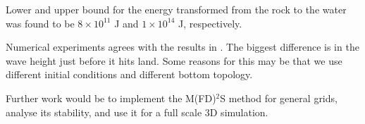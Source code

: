\documentclass[11pt]{article}
\begin{document}
Lower and upper bound for the energy transformed from the rock to the water was found to be $8\times 10^{11}$ J and $1\times 10^{14}$ J, respectively. 

Numerical experiments agrees with the results in \citep{harbitz14}. The biggest difference is in the wave height just before it hits land. Some reasons for this may be that we use different initial conditions and different 
bottom topology.

Further work would be to implement the M(FD)$^2$S method for general grids, analyse its stability, and use it for a full scale 3D simulation.

\clearpage
{}

  
\end{document}
